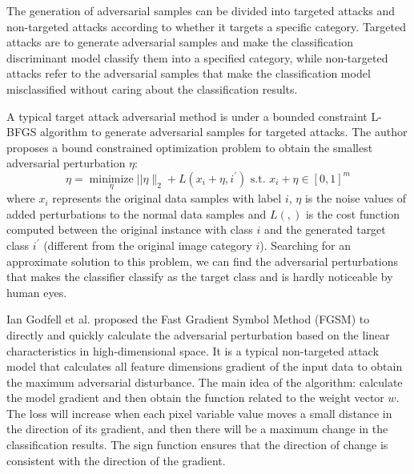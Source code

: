 \documentclass{ieeeaccess}
\begin{document}
The generation of adversarial samples can be divided into targeted attacks and non-targeted attacks according to whether it targets a specific category. Targeted attacks are to generate adversarial samples and make the classification discriminant model classify them into a specified category, while non-targeted attacks refer to the adversarial samples that make the classification model misclassified without caring about the classification results.

A typical target attack adversarial method is under a bounded constraint L-BFGS algorithm \cite{byrd1995limited} to generate adversarial samples for targeted attacks. The author proposes a bound constrained optimization problem \cite{tabacof2016exploring} to obtain the smallest adversarial perturbation $\eta$:
\begin{equation}
\eta = {\underset{\eta}{\operatorname{minimize}}} ||\eta\|_{2}+L\left(x_i+\eta, i^{\prime}\right)\text { s.t. } x_i+\eta \in [0,1]^{m}
\label{L-BFGS}
\end{equation}
where $x_i$ represents the original data samples with label $i$, $\eta$ is the noise values of added perturbations to the normal data samples and $L( , )$ is the cost function computed between the original instance with class $i$ and the generated target class $i^{\prime}$ (different from the original image category $i$). Searching for an approximate solution to this problem, we can find the adversarial perturbations that makes the classifier classify as the target class and is hardly noticeable by human eyes.

Ian Godfell et al. \cite{goodfellow2014explaining} proposed the Fast Gradient Symbol Method (FGSM) to directly and quickly calculate the adversarial perturbation based on the linear characteristics in high-dimensional space. It is a typical non-targeted attack model that calculates all feature dimensions gradient of the input data to obtain the maximum adversarial disturbance.
The main idea of the algorithm: calculate the model gradient and then obtain the function related to the weight vector $w$. The loss will increase when each pixel variable value moves a small distance in the direction of its gradient, and then there will be a maximum change in the classification results. The sign function ensures that the direction of change is consistent with the direction of the gradient. 
\end{document}
